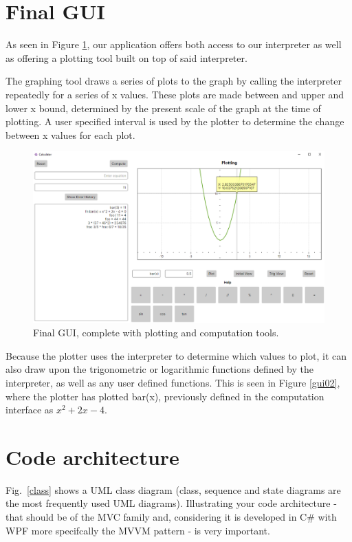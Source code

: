 \documentclass[a4paper, oneside, 11pt]{report}
\begin{document}
    \section{Final GUI}

    As seen in Figure \ref{gui08}, our application offers both access to our interpreter as well as offering a plotting tool built on top of said interpreter.

    The graphing tool draws a series of plots to the graph by calling the interpreter repeatedly for a series of x values. These plots are made between and upper and lower x bound, determined by the present scale of the graph at the time of plotting. A user specified interval is used by the plotter to determine the change between x values for each plot.

    \begin{figure}[htb]
        \includegraphics[width=0.9 \columnwidth]{advProgScreencap.png}
        \caption{Final GUI, complete with plotting and computation tools.}
        \label{gui08}
    \end{figure}

    Because the plotter uses the interpreter to determine which values to plot, it can also draw upon the trigonometric or logarithmic functions defined by the interpreter, as well as any user defined functions. This is seen in Figure \ref{gui02}, where the plotter has plotted bar(x), previously defined in the computation interface as \( x^2 + 2x - 4 \).


    \section{Code architecture}

    Fig.\ \ref{class} shows a UML class diagram (class, sequence and state diagrams are the most frequently used UML diagrams). Illustrating your code architecture - that should be of the MVC family and, considering it is developed in C\# with WPF more specifcally the MVVM pattern - is very important.
\end{document}
